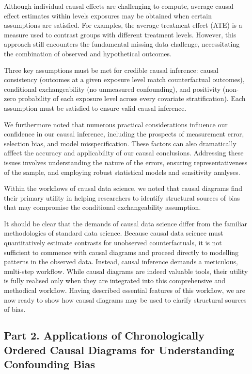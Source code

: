 \documentclass[
  singlecolumn,
  9pt]{article}
\begin{document}
Although individual causal effects are challenging to compute, average
causal effect estimates within levels exposures may be obtained when
certain assumptions are satisfied. For examples, the average treatment
effect (ATE) is a measure used to contrast groups with different
treatment levels. However, this approach still encounters the
fundamental missing data challenge, necessitating the combination of
observed and hypothetical outcomes.

Three key assumptions must be met for credible causal inference: causal
consistency (outcomes at a given exposure level match counterfactual
outcomes), conditional exchangeability (no unmeasured confounding), and
positivity (non-zero probability of each exposure level across every
covariate stratification). Each assumption must be satisfied to ensure
valid causal inference.

We furthermore noted that numerous practical considerations influence
our confidence in our causal inference, including the prospects of
measurement error, selection bias, and model misspecification. These
factors can also dramatically afffect the accuracy and applicability of
our causal conclusions. Addressing these issues involves understanding
the nature of the errors, ensuring representativeness of the sample, and
employing robust statistical models and sensitivity analyses.

Within the workflows of causal data science, we noted that causal
diagrams find their primary utility in helping researchers to identify
structural sources of bias that may compromise the conditional
exchangeability assumption.

It should be clear that the demands of causal data science differ from
the familiar methodologies of standard data science. Because causal data
science must quantitatively estimate contrasts for unobserved
counterfactuals, it is not sufficient to commence with causal diagrams
and proceed directly to modelling patterns in the observed data.
Instead, causal inference demands a meticulous, multi-step workflow.
While causal diagrams are indeed valuable tools, their utility is fully
realised only when they are integrated into this comprehensive and
methodical workflow. Having described essential features of this
workflow, we are now ready to show how causal diagrams may be used to
clarify structural sources of bias.

\subsection{Part 2. Applications of Chronologically Ordered Causal
Diagrams for Understanding Confounding
Bias}\label{part-2.-applications-of-chronologically-ordered-causal-diagrams-for-understanding-confounding-bias}
\end{document}
